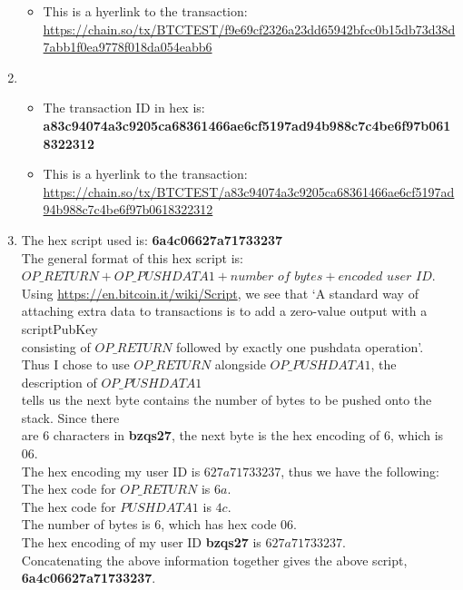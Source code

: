 \documentclass[12pt, a4paper]{article}
\begin{document}
\begin{enumerate}
\begin{itemize}
\item This is a hyerlink to the transaction:\\ \phantom{ab} \url{https://chain.so/tx/BTCTEST/f9e69cf2326a23dd65942bfcc0b15db73d38d7abb1f0ea9778f018da054eabb6}
\end{itemize}
\item \begin{itemize}
\renewcommand\labelitemi{\tiny$\bullet$}
\itemsep0em
\item The transaction ID in hex is:\\ \phantom{ab} \textbf{a83c94074a3c9205ca68361466ae6cf5197ad94b988c7c4be6f97b0618322312}
\item This is a hyerlink to the transaction:\\ \phantom{ab} \url{https://chain.so/tx/BTCTEST/a83c94074a3c9205ca68361466ae6cf5197ad94b988c7c4be6f97b0618322312}
\end{itemize}
\item The hex script used is: \textbf{6a4c06627a71733237}\\
\phantom{ab}The general format of this hex script is:\\
\phantom{abcd}$\textit{OP\_RETURN} + \textit{OP\_PUSHDATA1} + \textit{number of bytes} + \textit{encoded user ID}$.\\
\phantom{ab}Using \url{https://en.bitcoin.it/wiki/Script}, we see that `A standard way of\\ \phantom{ab}attaching extra data to transactions is to add a zero-value output with a scriptPubKey\\ \phantom{ab}consisting of $OP\_RETURN$ followed by exactly one pushdata operation'.\\
\phantom{ab}Thus I chose to use $\textit{OP\_RETURN}$ alongside $\textit{OP\_PUSHDATA1}$, the description of $\textit{OP\_PUSHDATA1}$\\ \phantom{ab}tells us the next byte contains the number of bytes to be pushed onto the stack. Since there\\ \phantom{ab}are $6$ characters in \textbf{bzqs27}, the next byte is the hex encoding of $6$, which is $06$.\\
\phantom{ab}The hex encoding my user ID is $627a71733237$, thus we have the following:\\
\phantom{ab}The hex code for $\textit{OP\_RETURN}$ is $6a$.\\
\phantom{ab}The hex code for $\textit{PUSHDATA1}$ is $4c$.\\
\phantom{ab}The number of bytes is $6$, which has hex code $06$.\\
\phantom{ab}The hex encoding of my user ID \textbf{bzqs27} is $627a71733237$.\\
\phantom{ab}Concatenating the above information together gives the above script, \textbf{6a4c06627a71733237}.

\end{enumerate}
\end{document}
